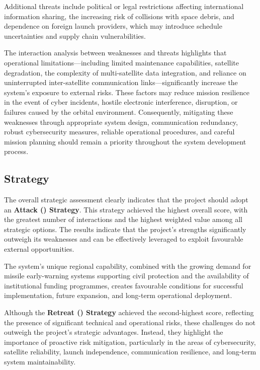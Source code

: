 Additional threats include political or legal restrictions affecting international information sharing, the increasing risk of collisions with space debris, and dependence on foreign launch providers, which may introduce schedule uncertainties and supply chain vulnerabilities.

The interaction analysis between weaknesses and threats highlights that operational limitations---including limited maintenance capabilities, satellite degradation, the complexity of multi-satellite data integration, and reliance on uninterrupted inter-satellite communication links---significantly increase the system's exposure to external risks. These factors may reduce mission resilience in the event of cyber incidents, hostile electronic interference,  disruption, or failures caused by the orbital environment. Consequently, mitigating these weaknesses through appropriate system design, communication redundancy, robust cybersecurity measures, reliable operational procedures, and careful mission planning should remain a priority throughout the system development process.

\subsection{Strategy}

The overall strategic assessment clearly indicates that the project should adopt an \textbf{Attack () Strategy}. This strategy achieved the highest overall score, with the greatest number of interactions and the highest weighted value among all strategic options. The results indicate that the project's strengths significantly outweigh its weaknesses and can be effectively leveraged to exploit favourable external opportunities.

The system's unique regional capability, combined with the growing demand for missile early-warning systems supporting civil protection and the availability of institutional funding programmes, creates favourable conditions for successful implementation, future expansion, and long-term operational deployment.

Although the \textbf{Retreat () Strategy} achieved the second-highest score, reflecting the presence of significant technical and operational risks, these challenges do not outweigh the project's strategic advantages. Instead, they highlight the importance of proactive risk mitigation, particularly in the areas of cybersecurity, satellite reliability, launch independence, communication resilience, and long-term system maintainability.

